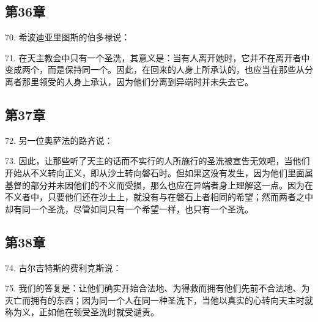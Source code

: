 
\subsection{第36章}

70. 希波迪亚里图斯的伯多禄说：\par

71. 在天主教会中只有一个圣洗，其意义是：当有人离开她时，它并不在离开者中变成两个，而是保持同一个。因此，在回来的人身上所承认的，也应当在那些从分离者那里领受的人身上承认，因为他们分离到异端时并未失去它。\par


\subsection{第37章}

72. 另一位奥萨法的路齐说：\par

73. 因此，让那些听了天主的话而不实行的人所施行的圣洗被宣告无效吧，当他们开始从不义转向正义，即从沙土转向磐石时。但如果这没有发生，因为他们里面属基督的部分并未因他们的不义而受损，那么也应在异端者身上理解这一点。因为在不义者中，只要他们还在沙土上，就没有与在磐石上者相同的希望；然而两者之中却有同一个圣洗，尽管如同只有一个希望一样，也只有一个圣洗。\par


\subsection{第38章}

74. 古尔吉特斯的费利克斯说：\par

75. 我们的答复是：让他们确实开始合法地、为得救而拥有他们先前不合法地、为灭亡而拥有的东西；因为同一个人在同一种圣洗下，当他以真实的心转向天主时就称为义，正如他在领受圣洗时就受谴责。\par

